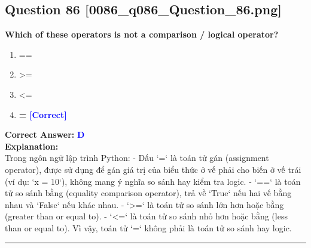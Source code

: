 \documentclass[11pt,a4paper]{article}
\begin{document}
\begin{minipage}{\textwidth}
\subsection*{Question 86 \quad \footnotesize{[0086_q086_Question_86.png]}}
\noindent \textbf{Which of these operators is not a comparison / logical operator?}

\begin{enumerate}[label=\Alph*.]
    \item ==
    \item >=
    \item <=
    \item \textbf{=} \hfill \textcolor{blue}{\textbf{[Correct]}}
\end{enumerate}

\noindent \textbf{Correct Answer:} \textcolor{blue}{\textbf{D}} \\[4pt]
\noindent \textbf{Explanation:}\\
Trong ngôn ngữ lập trình Python:\newline
- Dấu `=` là toán tử gán (assignment operator), được sử dụng để gán giá trị của biểu thức ở vế phải cho biến ở vế trái (ví dụ: `x = 10`), không mang ý nghĩa so sánh hay kiểm tra logic.\newline
- `==` là toán tử so sánh bằng (equality comparison operator), trả về `True` nếu hai vế bằng nhau và `False` nếu khác nhau.\newline
- `>=` là toán tử so sánh lớn hơn hoặc bằng (greater than or equal to).\newline
- `<=` là toán tử so sánh nhỏ hơn hoặc bằng (less than or equal to).\newline
Vì vậy, toán tử `=` không phải là toán tử so sánh hay logic.
\end{minipage}
\vspace{0.8cm}
\hrule
\vspace{0.5cm}
\end{document}
